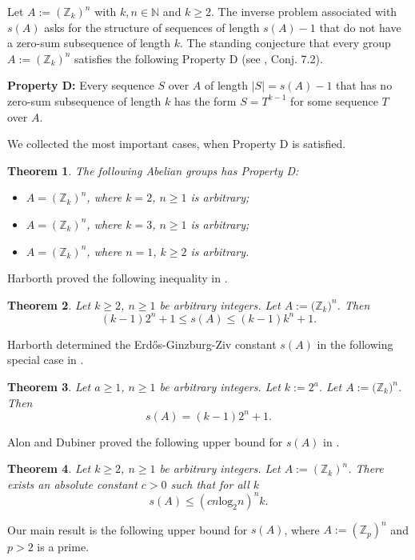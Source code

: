 \documentclass[12pt]{article}
\newtheorem{thm}{Theorem}[section]
\newcommand{\Zp}{\mathbb Z _p}
\newcommand{\Zk}{\mathbb Z _k}
\newcommand{\N}{\mathbb N}
\begin{document}
Let $A:=({\Zk})^n$ with $k,n\in \N$ and $k\geq 2$. The inverse problem associated with $s(A)$ asks for the structure of sequences of length $s(A)-1$ that do not have a zero-sum subsequence of length $k$. 
The standing conjecture that every group  $A:=({\Zk})^n$ satisfies the following Property D (see \cite{GG}, Conj. 7.2).

\medskip

{\bf Property D:} Every sequence $S$ over $A$ of length $|S|=s(A)-1$ that has no zero-sum subsequence of length $k$ has the form $S=T^{k-1}$ for some sequence $T$ over $A$.

\medskip

We collected the most important cases, when Property D is satisfied.
\begin{thm} \label{PropD}
The following Abelian groups has Property D:
\begin{itemize}
\item[(i)] $A=({\Zk})^n$, where $k=2$, $n\geq 1$ is arbitrary;
\item[(ii)] $A=({\Zk})^n$, where $k=3$, $n\geq 1$ is arbitrary;
\item[(iii)] $A=({\Zk})^n$, where $n=1$, $k\geq 2$ is arbitrary.
\end{itemize}
\end{thm}

Harborth proved the following inequality in \cite{H}.
\begin{thm} \label{Har}
Let $k\geq 2$, $n\geq 1$ be arbitrary integers.
Let $A:={(\Zk})^n$. Then
$$
(k-1) 2^n +1\leq s(A)\leq (k-1)k^n+1.
$$
\end{thm}


Harborth determined the Erd\H{o}s-Ginzburg-Ziv constant $s(A)$ in the following special case  in  \cite{H}.
\begin{thm} \label{Har2}
Let $a\geq 1$, $n\geq 1$ be arbitrary integers. Let $k:=2^a$. Let $A:={(\Zk})^n$. Then 
$$
s(A)=(k-1) 2^n +1.
$$
\end{thm}

Alon and Dubiner proved the following upper bound for $s(A)$ in \cite{AD}. 

\begin{thm} \label{AlDub}
Let $k\geq 2$, $n\geq 1$ be arbitrary integers. Let $A:=({\Zk})^n$. 
There exists an absolute constant $c>0$ such that for all $k$
$$
s(A)\leq (cn\mbox{log}_2 n)^nk.
$$
\end{thm}
Our main result is the following upper bound for $s(A)$, where $A:=({\Zp})^n$ and  $p>2$ is a prime.
\end{document}
